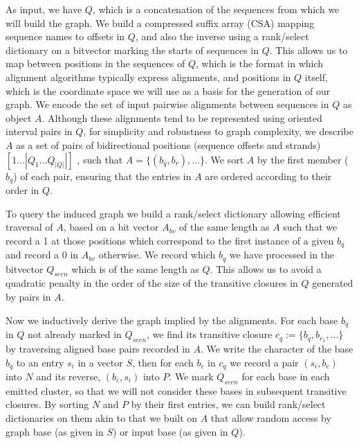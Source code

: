 
As input, we have $Q$, which is a concatenation of the sequences from which we will build the graph.
We build a compressed suffix array (CSA) mapping sequence names to offsets in $Q$, and also the inverse using a rank/select dictionary on a bitvector marking the starts of sequences in $Q$.
This allows us to map between positions in the sequences of $Q$, which is the format in which alignment algorithms typically express alignments, and positions in $Q$ itself, which is the coordinate space we will use as a basis for the generation of our graph.
We encode the set of input pairwise alignments between sequences in $Q$ as object $A$.
Although these alignments tend to be represented using oriented interval pairs in $Q$, for simplicity and robustness to graph complexity, we describe $A$ as a set of pairs of bidirectional positions (sequence offsets and strands) $[1 \ldots |Q_1 \ldots Q_{|Q|}|]$ , such that $A = \{ (b_{q}, b_{r}), \ldots \}$.
We sort $A$ by the first member ($b_{q}$) of each pair, ensuring that the entries in $A$ are ordered according to their order in $Q$.

To query the induced graph we build a rank/select dictionary allowing efficient traversal of $A$, based on a bit vector $A_{bv}$ of the same length as $A$ such that we record a 1 at those positions which correspond to the first instance of a given $b_{q}$ and record a 0 in $A_{bv}$ otherwise. 
We record which $b_{q}$ we have processed in the bitvector $Q_{seen}$ which is of the same length as $Q$.
This allows us to avoid a quadratic penalty in the order of the size of the transitive closures in $Q$ generated by pairs in $A$.

Now we inductively derive the graph implied by the alignments.
For each base $b_{q}$ in $Q$ not already marked in $Q_{seen}$, we find its transitive closure $c_{q} := \{b_{q}, b_{r_{1}}, \ldots \}$ by traversing aligned base pairs recorded in $A$.
We write the character of the base $b_{q}$ to an entry $s_i$ in a vector $S$, then for each $b_{c}$ in $c_{q}$ we record a pair $(s_{i}, b_{c})$ into $N$ and its reverse, $(b_{c}, s_{i})$ into $P$.
We mark $Q_{seen}$ for each base in each emitted cluster, so that we will not consider these bases in subsequent transitive closures.
By sorting $N$ and $P$ by their first entries, we can build rank/select dictionaries on them akin to that we built on $A$ that allow random access by graph base (as given in $S$) or input base (as given in $Q$).

